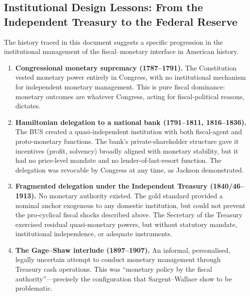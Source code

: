 \documentclass[12pt]{article}
\begin{document}
\subsection{Institutional Design Lessons: From the Independent Treasury
to the Federal Reserve}

The history traced in this document suggests a specific progression in
the institutional management of the fiscal--monetary interface in
American history.

\begin{enumerate}

  \item \textbf{Congressional monetary supremacy (1787--1791).}
    The Constitution vested monetary power entirely in Congress, with
    no institutional mechanism for independent monetary management.
    This is pure fiscal dominance: monetary outcomes are whatever
    Congress, acting for fiscal-political reasons, dictates.

  \item \textbf{Hamiltonian delegation to a national bank (1791--1811,
    1816--1836).}  The BUS created a quasi-independent institution with
    both fiscal-agent and proto-monetary functions.  The bank's
    private-shareholder structure gave it incentives (profit,
    solvency) broadly aligned with monetary stability, but it had
    no price-level mandate and no lender-of-last-resort function.
    The delegation was revocable by Congress at any time, as Jackson
    demonstrated.

  \item \textbf{Fragmented delegation under the Independent Treasury
    (1840/46--1913).}  No monetary authority existed.  The gold
    standard provided a nominal anchor exogenous to any domestic
    institution, but could not prevent the pro-cyclical fiscal
    shocks described above.  The Secretary of the Treasury
    exercised residual quasi-monetary powers, but without statutory
    mandate, institutional independence, or adequate instruments.

  \item \textbf{The Gage--Shaw interlude (1897--1907).}  An informal,
    personalised, legally uncertain attempt to conduct monetary
    management through Treasury cash operations.  This was ``monetary
    policy by the fiscal authority''---precisely the configuration
    that Sargent--Wallace show to be problematic.


\end{enumerate}
\end{document}
